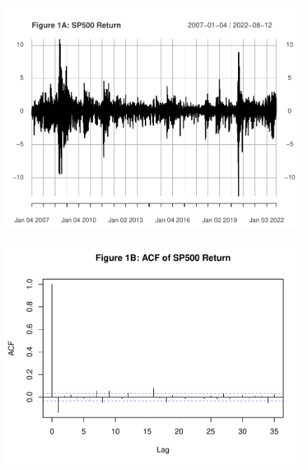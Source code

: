 \documentclass[]{book}
\theoremstyle{definition}
\theoremstyle{definition}
\theoremstyle{definition}
\theoremstyle{remark}
\begin{document}
\begin{figure}

{\centering \includegraphics[width=1\linewidth]{bookdown-demo_files/figure-latex/ch7-figure1-1} 

}

\end{figure}\begin{figure}

{\centering \includegraphics[width=1\linewidth]{bookdown-demo_files/figure-latex/ch7-figure1-2} 

}

\end{figure}\begin{figure}


\end{figure}
\end{document}
